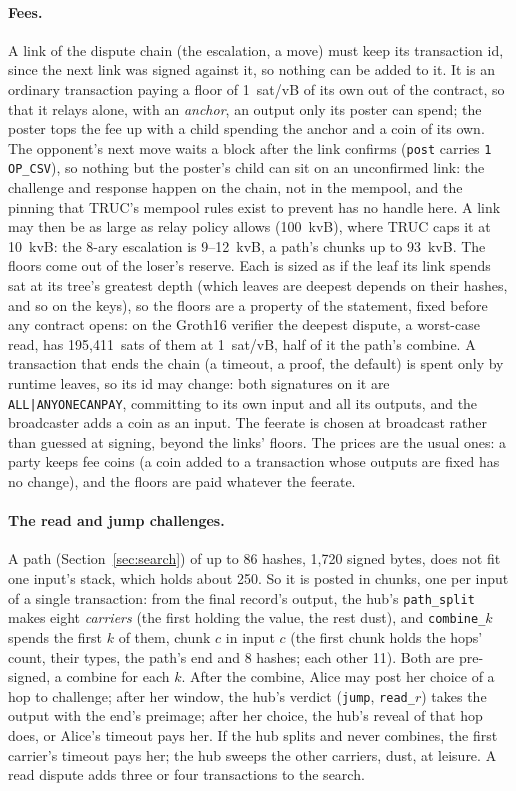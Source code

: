 \documentclass[11pt]{article}
\newcommand{\tx}[1]{\texttt{#1}}
\begin{document}
\paragraph{Fees.} A link of the dispute chain (the escalation, a move)
must keep its transaction id, since the next link was signed against it,
so nothing can be added to it. It is an ordinary transaction paying a
floor of 1~sat/vB of its own out of the contract, so that it relays
alone, with an \emph{anchor}, an output only its poster can spend; the
poster tops the fee up with a child spending the anchor and a coin of
its own. The opponent's next move waits a block after the link confirms
(\tx{post} carries \texttt{1 OP\_CSV}), so nothing but the poster's child
can sit on an unconfirmed link: the challenge and response happen on the
chain, not in the mempool, and the pinning that TRUC's mempool rules
exist to prevent has no handle here. A link may then be as large as
relay policy allows (100~kvB), where TRUC caps it at 10~kvB: the 8-ary
escalation is 9--12~kvB, a path's chunks up to 93~kvB. The floors come
out of the loser's reserve. Each is sized as if the leaf its link spends
sat at its tree's greatest depth (which leaves are deepest depends on
their hashes, and so on the keys), so the floors are a property of the
statement, fixed before any contract opens: on the Groth16 verifier the
deepest dispute, a worst-case read, has 195,411~sats of them at
1~sat/vB, half of it the path's combine. A transaction that ends the chain (a
timeout, a proof, the default) is spent only by runtime leaves, so its
id may change: both signatures on it are \texttt{ALL|ANYONECANPAY},
committing to its own input and all its outputs, and the broadcaster
adds a coin as an input. The feerate is chosen at broadcast rather than
guessed at signing, beyond the links' floors. The prices are the usual
ones: a party keeps fee coins (a coin added to a transaction whose
outputs are fixed has no change), and the floors are paid whatever the
feerate.

\paragraph{The read and jump challenges.} A path (Section~\ref{sec:search})
of up to 86 hashes, 1,720 signed bytes, does not fit one input's stack,
which holds about 250. So it is posted in chunks, one per input of a
single transaction: from the final record's output, the hub's
\tx{path\_split} makes eight \emph{carriers} (the first holding the
value, the rest dust), and \tx{combine\_$k$} spends the first $k$ of
them, chunk $c$ in input $c$ (the first chunk holds the hops' count,
their types, the path's end and 8 hashes; each other 11). Both are
pre-signed, a combine for each $k$. After the combine, Alice may post her
choice of a hop to challenge; after her window, the hub's verdict
(\tx{jump}, \tx{read\_$r$}) takes the output with the end's preimage;
after her choice, the hub's reveal of that hop does, or Alice's timeout
pays her. If the hub splits and never combines, the first carrier's
timeout pays her; the hub sweeps the other carriers, dust, at leisure. A
read dispute adds three or four transactions to the search.
\end{document}
